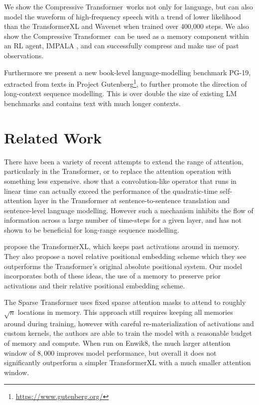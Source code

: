 We show the Compressive Transformer~works not only for language, but can also model the waveform of high-frequency speech with a trend of lower likelihood than the TransformerXL and Wavenet \citep{oord2016wavenet} when trained over 400,000 steps. We also show the Compressive Transformer~can be used as a memory component within an RL agent, IMPALA \citep{espeholt2018impala}, and can successfully compress and make use of past observations.

Furthermore we present a new book-level language-modelling benchmark PG-19, extracted from texts in Project Gutenberg\footnote{\url{https://www.gutenberg.org/}}, to further promote the direction of long-context sequence modelling. This is over double the size of existing LM benchmarks and contains text with much longer contexts.
\section{Related Work} There have been a variety of recent attempts to extend the range of attention, particularly in the Transformer, or to replace the attention operation with something less expensive. \citet{wu2019pay} show that a convolution-like operator that runs in linear time can actually exceed the performance of the quadratic-time self-attention layer in the Transformer at sentence-to-sentence translation and sentence-level language modelling. However such a mechanism inhibits the flow of information across a large number of time-steps for a given layer, and has not shown to be beneficial for long-range sequence modelling.

\citet{dai2019transformer} propose the TransformerXL, which keeps past activations around in memory. They also propose a novel relative positional embedding scheme which they see outperforms the Transformer's original absolute positional system. Our model incorporates both of these ideas, the use of a memory to preserve prior activations and their relative positional embedding scheme.

The Sparse Transformer \citep{child2019generating} uses fixed sparse attention masks to attend to roughly $\sqrt{n}$ locations in memory. This approach still requires keeping all memories around during training, however with careful re-materialization of activations and custom kernels, the authors are able to train the model with a reasonable budget of memory and compute. When run on Enwik8, the much larger attention window of $8,000$ improves model performance, but overall it does not significantly outperform a simpler TransformerXL with a much smaller attention window.

